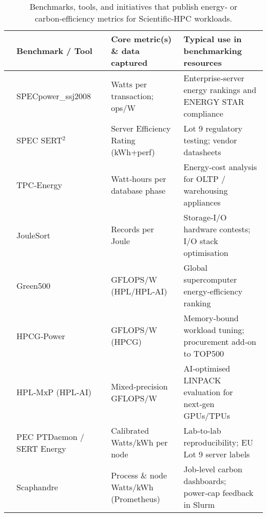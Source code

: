 

\begin{table*}[hptb]

  \caption{Benchmarks, tools, and initiatives that publish energy‑ or carbon‑efficiency metrics for Scientific‑HPC workloads. }
  \label{tab:hpc_energy_catalog}
  
  
  \begin{tabularx}{0.25\textwidth}{|p{}p{}p{}|}
    \toprule
    &
     \headerfont\textbf{Benchmark / Tool} & 
     &
     \headerfont\textbf{Core metric(s) \& data captured} & \headerfont\textbf{Typical use in benchmarking resources} \\ 
    \midrule
    \hline
   & SPECpower\_ssj2008 & \cite{specpower}            & Watts per transaction; ops/W & Enterprise‑server energy rankings and ENERGY STAR compliance \\  
   & SPEC SERT$^{2}$  & \cite{sert2}                   & Server Efficiency Rating (kWh+perf)& Lot 9 regulatory testing; vendor datasheets \\  
   & TPC‑Energy  & \cite{tpcenergy}                    & Watt‑hours per database phase & Energy‑cost analysis for OLTP / warehousing appliances \\  
   & JouleSort  & \cite{joulesort}                     & Records per Joule & Storage‑I/O hardware contests; I/O stack optimisation \\  
   & Green500  & \cite{green500}                       & GFLOPS/W (HPL/HPL‑AI) & Global supercomputer energy‑efficiency ranking \\  
   & HPCG‑Power  & \cite{hpcgpower}                    & GFLOPS/W (HPCG) & Memory‑bound workload tuning; procurement add‑on to TOP500 \\  
   & HPL‑MxP (HPL‑AI)  & \cite{hplmxphplai}            & Mixed‑precision GFLOPS/W & AI‑optimised LINPACK evaluation for next‑gen GPUs/TPUs \\  
   & PEC PTDaemon / SERT Energy  & \cite{specptdaemonser} & Calibrated Watts/kWh per node & Lab‑to‑lab reproducibility; EU Lot 9 server labels \\  
   & Scaphandre  & \cite{scaphandre}                    & Process \& node Watts/kWh (Prometheus) & Job‑level carbon dashboards; power‑cap feedback in Slurm \\  

\end{tabularx}
\end{table*}
